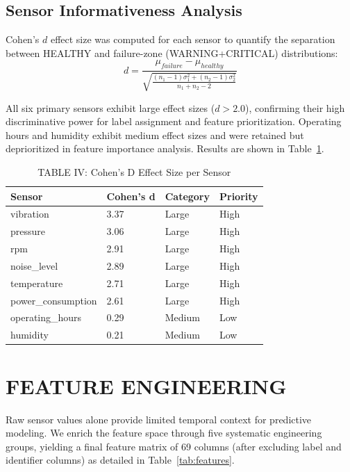 \documentclass[conference]{IEEEtran}
\begin{document}
\subsection{Sensor Informativeness Analysis}

Cohen's $d$ effect size was computed for each sensor to quantify the separation between HEALTHY and failure-zone (WARNING+CRITICAL) distributions:
\begin{equation}
d = \frac{\mu_{failure} - \mu_{healthy}}{\sqrt{\frac{(n_1-1)\sigma_1^2 + (n_2-1)\sigma_2^2}{n_1+n_2-2}}}
\label{eq:cohend}
\end{equation}

All six primary sensors exhibit large effect sizes ($d > 2.0$), confirming their high discriminative power for label assignment and feature prioritization. Operating hours and humidity exhibit medium effect sizes and were retained but deprioritized in feature importance analysis. Results are shown in Table~\ref{tab:cohend}.

\begin{table}[htbp]
\caption{TABLE IV: Cohen's D Effect Size per Sensor}
\centering
\begin{tabular}{llll}
\hline
\textbf{Sensor} & \textbf{Cohen's d} & \textbf{Category} & \textbf{Priority} \\
\hline
vibration & 3.37 & Large & High \\
pressure & 3.06 & Large & High \\
rpm & 2.91 & Large & High \\
noise\_level & 2.89 & Large & High \\
temperature & 2.71 & Large & High \\
power\_consumption & 2.61 & Large & High \\
operating\_hours & 0.29 & Medium & Low \\
humidity & 0.21 & Medium & Low \\
\hline
\end{tabular}
\label{tab:cohend}
\end{table}

\section{FEATURE ENGINEERING}

Raw sensor values alone provide limited temporal context for predictive modeling. We enrich the feature space through five systematic engineering groups, yielding a final feature matrix of 69 columns (after excluding label and identifier columns) as detailed in Table~\ref{tab:features}.
\end{document}
